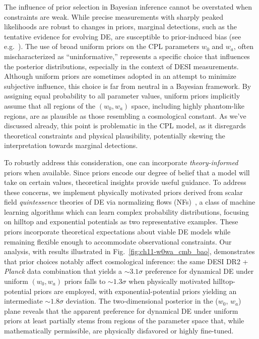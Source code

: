 The influence of prior selection in Bayesian inference cannot be overstated when constraints are weak. While precise measurements with sharply peaked likelihoods are robust to changes in priors, marginal detections, such as the tentative evidence for evolving DE, are susceptible to prior-induced bias (see e.g.~\cite{Steinhardt:2025znn,Bayat:2025xfr}). The use of broad uniform priors on the CPL parameters $w_0$ and $w_a$, often mischaracterized as ``uninformative,'' represents a specific choice that influences the posterior distributions, especially in the context of DESI measurements. Although uniform priors are sometimes adopted in an attempt to minimize subjective influence, this choice is far from neutral in a Bayesian framework. By assigning equal probability to all parameter values, uniform priors implicitly assume that all regions of the $(w_0, w_a)$ space, including highly phantom-like regions, are as plausible as those resembling a cosmological constant. As we've discussed already, this point is problematic in the CPL model, as it disregards theoretical constraints and physical plausibility, potentially skewing the interpretation towards marginal detections.


To robustly address this consideration, one can incorporate \textit{theory-informed} priors when available. Since priors encode our degree of belief that a model will take on certain values, theoretical insights provide useful guidance. To address these concerns, we implement physically motivated priors derived from scalar field {\it quintessence} theories of DE via normalizing flows (NFs)~\cite{nfs, 2017arXiv170507057P},  a class of machine learning algorithms which can learn complex probability distributions,
focusing on hilltop and exponential potentials as two representative examples.
These priors incorporate theoretical expectations about viable DE models while remaining flexible enough to accommodate observational constraints. Our analysis, with results illustrated in Fig.~\ref{fig:ch11-w0wa_cmb_bao}, demonstrates that prior choices
notably affect cosmological inference: the same DESI DR2 + \textit{Planck} data combination that yields a $\sim 3.1\sigma$ preference for dynamical DE under uniform $(w_0,w_a)$ priors falls to $\sim 1.3\sigma$  when physically motivated hilltop-potential priors are employed, with exponential-potential priors yielding an intermediate $\sim 1.8\sigma$ deviation. The two-dimensional posterior in the ($w_0$, $w_a$) plane reveals that the apparent preference for dynamical DE under uniform priors
at least partially stems from regions of the parameter space that, while mathematically permissible, are physically disfavored or highly fine-tuned.



